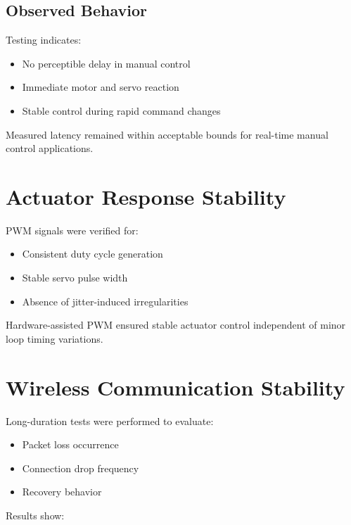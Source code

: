 \subsection{Observed Behavior}

Testing indicates:

\begin{itemize}
	\item No perceptible delay in manual control
	\item Immediate motor and servo reaction
	\item Stable control during rapid command changes
\end{itemize}

Measured latency remained within acceptable bounds for real-time manual control applications.


\section{Actuator Response Stability}

PWM signals were verified for:

\begin{itemize}
	\item Consistent duty cycle generation
	\item Stable servo pulse width
	\item Absence of jitter-induced irregularities
\end{itemize}

Hardware-assisted PWM ensured stable actuator control independent of minor loop timing variations.


\section{Wireless Communication Stability}

Long-duration tests were performed to evaluate:

\begin{itemize}
	\item Packet loss occurrence
	\item Connection drop frequency
	\item Recovery behavior
\end{itemize}

Results show:

